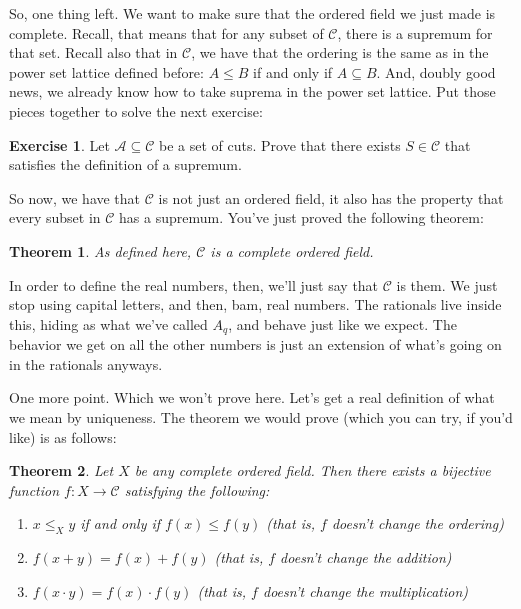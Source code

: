 \documentclass{article}
\newtheorem{theorem}{Theorem}
\theoremstyle{definition}
\newtheorem{exercise}{Exercise}
\begin{document}
So, one thing left. We want to make sure that the ordered field we just made is complete. Recall, that means that for any subset of $\mathcal{C}$, there is a supremum for that set. Recall also that in $\mathcal{C}$, we have that the ordering is the same as in the power set lattice defined before: $A\leq B$ if and only if $A\subseteq B$. And, doubly good news, we already know how to take suprema in the power set lattice. Put those pieces together to solve the next exercise:

\begin{exercise}
Let $\mathcal{A}\subseteq \mathcal{C}$ be a set of cuts. Prove that there exists $S\in \mathcal{C}$ that satisfies the definition of a supremum.
\end{exercise}

So now, we have that $\mathcal{C}$ is not just an ordered field, it also has the property that every subset in $\mathcal{C}$ has a supremum. You've just proved the following theorem:

\begin{theorem}
As defined here, $\mathcal{C}$ is a complete ordered field.
\end{theorem}

In order to define the real numbers, then, we'll just say that $\mathcal{C}$ is them. We just stop using capital letters, and then, bam, real numbers. The rationals live inside this, hiding as what we've called $A_q$, and behave just like we expect. The behavior we get on all the other numbers is just an extension of what's going on in the rationals anyways.

One more point. Which we won't prove here. Let's get a real definition of what we mean by uniqueness. The theorem we would prove (which you can try, if you'd like) is as follows:

\begin{theorem}
Let $X$ be any complete ordered field. Then there exists a bijective function $f:X\to \mathcal{C}$ satisfying the following:
\begin{enumerate}
\item $x\leq_X y$ if and only if $f(x)\leq f(y)$ (that is, $f$ doesn't change the ordering)
\item $f(x+y) = f(x)+f(y)$ (that is, $f$ doesn't change the addition)
\item $f(x\cdot y) = f(x)\cdot f(y)$ (that is, $f$ doesn't change the multiplication)
\end{enumerate}
\end{theorem}
\end{document}

